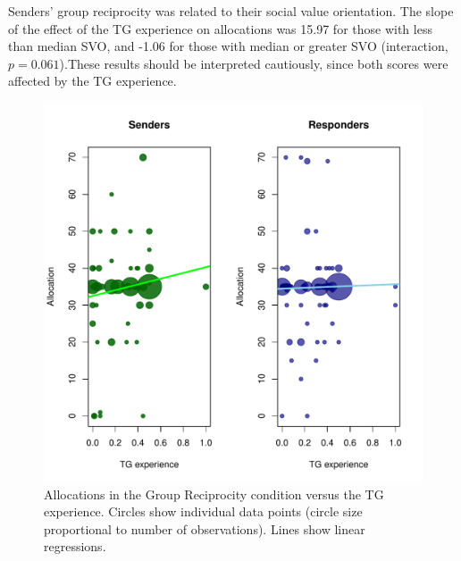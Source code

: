 \documentclass[12pt,a4paper]{article}\usepackage[]{graphicx}\usepackage[]{color}
\makeatletter
\def\maxwidth{ %
  \ifdim\Gin@nat@width>\linewidth
    \linewidth
  \else
    \Gin@nat@width
  \fi
}
\newenvironment{knitrout}{}{} %
\makeatother
\begin{document}

Senders' group reciprocity was related to their social value orientation. The slope of the effect of the TG experience on allocations was 
15.97 for those with less than median SVO, and 
-1.06 for those with median or greater SVO 
(interaction, $p= 0.061$).These results should be interpreted cautiously, since both scores were 
affected by the TG experience. 

\begin{knitrout}
\color{fgcolor}\begin{figure}
\includegraphics[width=\maxwidth]{figure/plots-1} \caption[Allocations in the Group Reciprocity condition versus the TG experience]{Allocations in the Group Reciprocity condition versus the TG experience. Circles show individual data points (circle size proportional to number of observations). Lines show linear regressions.}\label{fig:plots}
\end{figure}


\end{knitrout}
\end{document}
